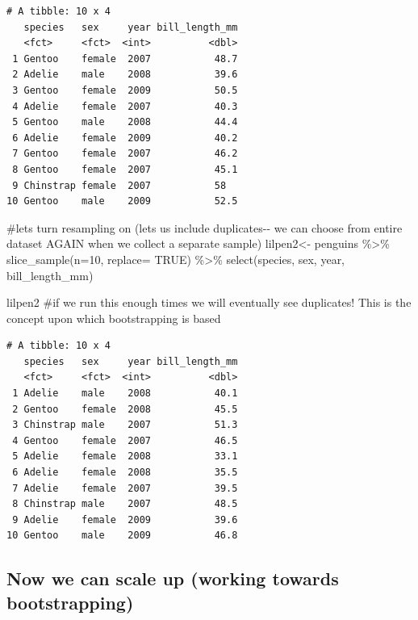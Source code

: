 \documentclass[
  letterpaper,
  DIV=11,
  numbers=noendperiod]{scrartcl}
\newenvironment{Shaded}{\begin{snugshade}}{\end{snugshade}}
\newcommand{\AttributeTok}[1]{\textcolor[rgb]{0.40,0.45,0.13}{#1}}
\newcommand{\CommentTok}[1]{\textcolor[rgb]{0.37,0.37,0.37}{#1}}
\newcommand{\ConstantTok}[1]{\textcolor[rgb]{0.56,0.35,0.01}{#1}}
\newcommand{\DecValTok}[1]{\textcolor[rgb]{0.68,0.00,0.00}{#1}}
\newcommand{\FunctionTok}[1]{\textcolor[rgb]{0.28,0.35,0.67}{#1}}
\newcommand{\NormalTok}[1]{\textcolor[rgb]{0.00,0.23,0.31}{#1}}
\newcommand{\OtherTok}[1]{\textcolor[rgb]{0.00,0.23,0.31}{#1}}
\newcommand{\SpecialCharTok}[1]{\textcolor[rgb]{0.37,0.37,0.37}{#1}}
\begin{document}
\begin{verbatim}
# A tibble: 10 x 4
   species   sex     year bill_length_mm
   <fct>     <fct>  <int>          <dbl>
 1 Gentoo    female  2007           48.7
 2 Adelie    male    2008           39.6
 3 Gentoo    female  2009           50.5
 4 Adelie    female  2007           40.3
 5 Gentoo    male    2008           44.4
 6 Adelie    female  2009           40.2
 7 Gentoo    female  2007           46.2
 8 Gentoo    female  2007           45.1
 9 Chinstrap female  2007           58  
10 Gentoo    male    2009           52.5
\end{verbatim}

\begin{Shaded}
\begin{Highlighting}[]
\CommentTok{\#let\textquotesingle{}s turn resampling on (let\textquotesingle{}s us include duplicates{-}{-} we can choose from entire dataset AGAIN when we collect a separate sample)}
\NormalTok{lilpen2}\OtherTok{\textless{}{-}}\NormalTok{ penguins }\SpecialCharTok{\%\textgreater{}\%}
  \FunctionTok{slice\_sample}\NormalTok{(}\AttributeTok{n=}\DecValTok{10}\NormalTok{, }\AttributeTok{replace=} \ConstantTok{TRUE}\NormalTok{) }\SpecialCharTok{\%\textgreater{}\%}
  \FunctionTok{select}\NormalTok{(species, sex, year, bill\_length\_mm)}

\NormalTok{lilpen2 }\CommentTok{\#if we run this enough times we will eventually see duplicates! This is the concept upon which bootstrapping is based}
\end{Highlighting}
\end{Shaded}

\begin{verbatim}
# A tibble: 10 x 4
   species   sex     year bill_length_mm
   <fct>     <fct>  <int>          <dbl>
 1 Adelie    male    2008           40.1
 2 Gentoo    female  2008           45.5
 3 Chinstrap male    2007           51.3
 4 Gentoo    female  2007           46.5
 5 Adelie    female  2008           33.1
 6 Adelie    female  2008           35.5
 7 Adelie    female  2007           39.5
 8 Chinstrap male    2007           48.5
 9 Adelie    female  2009           39.6
10 Gentoo    male    2009           46.8
\end{verbatim}

\hypertarget{now-we-can-scale-up-working-towards-bootstrapping}{%
\subsection{Now we can scale up (working towards
bootstrapping)}\label{now-we-can-scale-up-working-towards-bootstrapping}}
\end{document}
